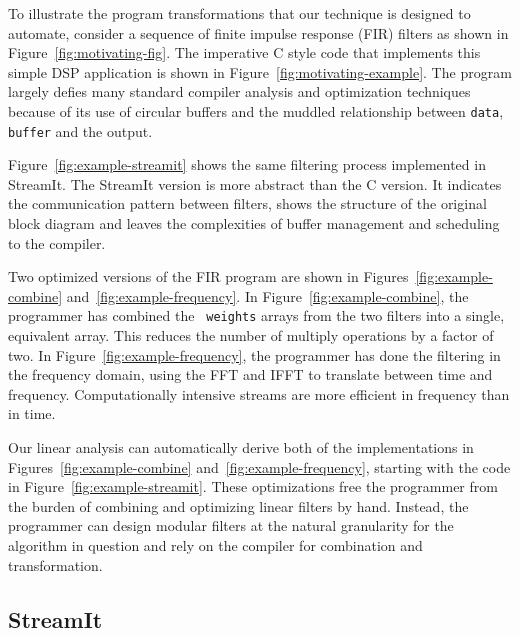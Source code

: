 To illustrate the program transformations that our technique is
designed to automate, consider a sequence of finite impulse response
(FIR) filters as shown in Figure~\ref{fig:motivating-fig}. The
imperative C style code that implements this simple DSP application is
shown in Figure~\ref{fig:motivating-example}. 
The program largely defies many standard compiler analysis
and optimization techniques because of its use of circular buffers and
the muddled relationship between {\tt data}, {\tt buffer} and the
output.

Figure~\ref{fig:example-streamit} shows the same filtering process
implemented in StreamIt. The StreamIt version is more abstract than
the C version.  It indicates the communication pattern between filters,
shows the structure of the original block diagram and leaves
the complexities of buffer management and scheduling to the compiler.

Two optimized versions of the FIR program are shown in
Figures~\ref{fig:example-combine} and~\ref{fig:example-frequency}.  In
Figure~\ref{fig:example-combine}, the programmer has combined the {\tt
weights} arrays from the two filters into a single, equivalent array.
This reduces the number of multiply operations by a factor of two.  In
Figure~\ref{fig:example-frequency}, the programmer has done the
filtering in the frequency domain, using the FFT and IFFT to translate
between time and frequency.  Computationally intensive
streams are more efficient in frequency than in time.

Our linear analysis can automatically derive both of the
implementations in Figures~\ref{fig:example-combine}
and~\ref{fig:example-frequency}, starting with the code in
Figure~\ref{fig:example-streamit}.  These optimizations free the
programmer from the burden of combining and optimizing linear filters
by hand.  Instead, the programmer can design modular filters at the
natural granularity for the algorithm in question and rely on the
compiler for combination and transformation.

\subsection{StreamIt}


